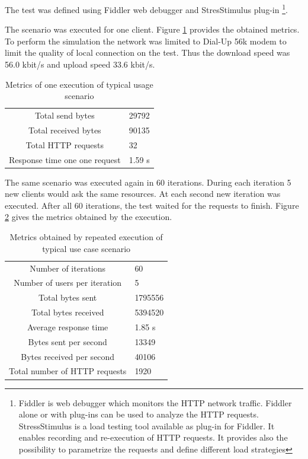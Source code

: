 The test was defined using Fiddler web debugger and StresStimulus plug-in \footnote{Fiddler is web debugger which monitors the HTTP network traffic. Fiddler alone or with plug-ins can be used to analyze the HTTP requests. StressStimulus is a load testing tool available as plug-in for Fiddler. It enables recording and re-execution of HTTP requests. It provides also the possibility to parametrize the requests and define different load strategies}.

The scenario was executed for one client. Figure \ref{tab:metrics_one} provides the obtained metrics. To perform the simulation the network was limited to Dial-Up 56k modem to limit the quality of local connection on the test. Thus the download speed was 56.0 kbit/s and upload speed 33.6 kbit/s.

\begin{table}
\begin{center}
\begin{tabular}{|c|l|}
\hline
Total send bytes & 29792 \\
Total received bytes & 90135 \\
Total HTTP requests & 32 \\
Response time one one request & 1.59 s \\
\hline
\end{tabular}
\end{center}
\caption{Metrics of one execution of typical usage scenario}
\label{tab:metrics_one}
\end{table}

The same scenario was executed again in 60 iterations. During each iteration 5 new clients would ask the same resources. At each second new iteration was executed. After all 60 iterations, the test waited for the requests to finish. Figure \ref{tab:metrics_300} gives the metrics obtained by the execution.

\begin{table}
\begin{center}
\begin{tabular}{|c|l|}
\hline
Number of iterations & 60 \\
Number of users per iteration & 5 \\
Total bytes sent & 1795556 \\
Total bytes received & 5394520 \\
Average response time & 1.85 s \\
Bytes sent per second & 13349 \\
Bytes received per second & 40106 \\
Total number of HTTP requests & 1920 \\
\hline
\end{tabular}
\end{center}
\caption{Metrics obtained by repeated execution of typical use case scenario}
\label{tab:metrics_300}
\end{table}